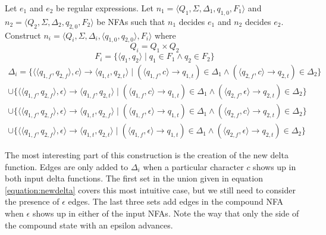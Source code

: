 Let $e_1$ and $e_2$ be regular expressions. Let
$n_1 = \langle Q_1, \Sigma, \Delta_1, q_{1,0}, F_1 \rangle$ and
$n_2 = \langle Q_2, \Sigma, \Delta_2, q_{2,0}, F_2 \rangle$
be NFAs such that $n_1$ decides $e_1$ and $n_2$ decides $e_2$.
Construct $n_i = \langle Q_i, \Sigma, \Delta_i, \langle q_{1,0}, q_{2,0} \rangle, F_i \rangle$
where
$$Q_i = Q_1 \times Q_2$$
$$F_i = \{ \langle q_1, q_2 \rangle \mid q_1 \in F_1 \wedge q_2 \in F_2\}$$
\begin{equation}
\label{equation:newdelta}
\begin{split}
  \Delta_i =
    \{ \langle \langle q_{1, f}, q_{2, f} \rangle, c \rangle
            \rightarrow \langle q_{1, t}, q_{2, t} \rangle
        \mid
          (\langle q_{1, f}, c \rangle \rightarrow q_{1, t}) \in \Delta_1
          \wedge
          (\langle q_{2, f}, c \rangle \rightarrow q_{2, t}) \in \Delta_2
     \} \\
     \cup
     \{
        \langle \langle q_{1, f}, q_{2, f} \rangle, \epsilon \rangle
          \rightarrow \langle q_{1, f}, q_{2, t} \rangle
        \mid
          (\langle q_{1, f}, c \rangle \rightarrow q_{1, t}) \in \Delta_1
          \wedge
          (\langle q_{2, f}, \epsilon \rangle \rightarrow q_{2, t}) \in \Delta_2
     \} \\
     \cup
     \{
        \langle \langle q_{1, f}, q_{2, f} \rangle, \epsilon \rangle
          \rightarrow \langle q_{1, t}, q_{2, f} \rangle
        \mid
          (\langle q_{1, f}, \epsilon \rangle \rightarrow q_{1, t}) \in \Delta_1
          \wedge
          (\langle q_{2, f}, c \rangle \rightarrow q_{2, t}) \in \Delta_2
   \} \\
     \cup
     \{
        \langle \langle q_{1, f}, q_{2, f} \rangle, \epsilon \rangle
          \rightarrow \langle q_{1, t}, q_{2, t} \rangle
        \mid
          (\langle q_{1, f}, \epsilon \rangle \rightarrow q_{1, t}) \in \Delta_1
          \wedge
          (\langle q_{2, f}, \epsilon \rangle \rightarrow q_{2, t}) \in \Delta_2
       \}
\end{split}
\end{equation}

The most interesting part of this construction is the creation of the
new delta function. Edges are only added to $\Delta_i$ when a particular
character $c$ shows up in both input delta functions. The first set in
the union given in equation \ref{equation:newdelta} covers this most
intuitive case, but we still need to consider
the presence of $\epsilon$ edges. The last three sets add edges in the
compound NFA when $\epsilon$ shows up in either of the input NFAs.
Note the way that only the side of the compound state with an
epsilon advances.

